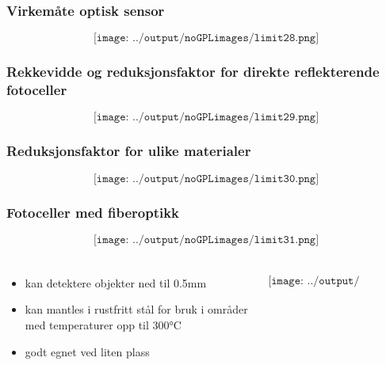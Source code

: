 \documentclass[aspectratio=169,xcolor=dvipsnames]{beamer}
\begin{document}
\begin{frame}
	\frametitle{Virkemåte optisk sensor}
	$$\texttt{[image: ../output/noGPLimages/limit28.png]}$$
\end{frame}
\begin{frame}
	\frametitle{Rekkevidde og reduksjonsfaktor for direkte reflekterende fotoceller}
	$$\texttt{[image: ../output/noGPLimages/limit29.png]}$$
\end{frame}
\begin{frame}
	\frametitle{Reduksjonsfaktor for ulike materialer}
	$$\texttt{[image: ../output/noGPLimages/limit30.png]}$$
\end{frame}
\begin{frame}
	\frametitle{Fotoceller med fiberoptikk}
	$$\texttt{[image: ../output/noGPLimages/limit31.png]}$$
\end{frame}
\begin{frame}
	\frametitle{}
	\begin{columns}
		\begin{column}{0.5\textwidth}
			\begin{itemize}
				\item kan detektere objekter ned til 0.5mm
				\item kan mantles i rustfritt stål for bruk i områder med temperaturer opp til 300°C
				\item godt egnet ved liten plass
			\end{itemize}

			
		\end{column}

		\begin{column}{0.5\textwidth}
	$$\texttt{[image: ../output/noGPLimages/limit32.png]}$$
		\end{column}
	\end{columns}
\end{frame}
%
\end{document}
